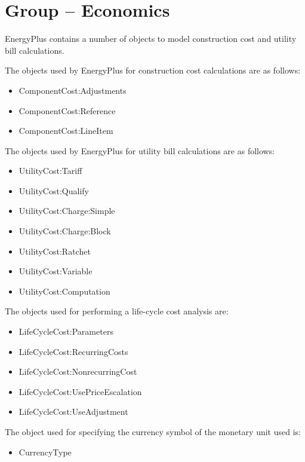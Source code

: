 \section{Group -- Economics}\label{group-economics}

EnergyPlus contains a number of objects to model construction cost and utility bill calculations.

The objects used by EnergyPlus for construction cost calculations are as follows:

\begin{itemize}
\item
  ComponentCost:Adjustments
\item
  ComponentCost:Reference
\item
  ComponentCost:LineItem
\end{itemize}

The objects used by EnergyPlus for utility bill calculations are as follows:

\begin{itemize}
\item
  UtilityCost:Tariff
\item
  UtilityCost:Qualify
\item
  UtilityCost:Charge:Simple
\item
  UtilityCost:Charge:Block
\item
  UtilityCost:Ratchet
\item
  UtilityCost:Variable
\item
  UtilityCost:Computation
\end{itemize}

The objects used for performing a life-cycle cost analysis are:

\begin{itemize}
\item
  LifeCycleCost:Parameters
\item
  LifeCycleCost:RecurringCosts
\item
  LifeCycleCost:NonrecurringCost
\item
  LifeCycleCost:UsePriceEscalation
\item
  LifeCycleCost:UseAdjustment
\end{itemize}

The object used for specifying the currency symbol of the monetary unit used is:

\begin{itemize}
\tightlist
\item
  CurrencyType
\end{itemize}